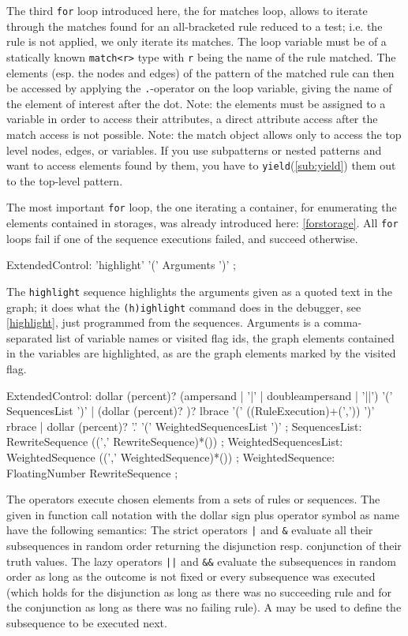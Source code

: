 The third \texttt{for} loop introduced here, the for matches loop, allows to iterate through the matches found for an all-bracketed rule reduced to a test; i.e. the rule is not applied, we only iterate its matches.
The loop variable must be of a statically known \texttt{match<r>} type with \texttt{r} being the name of the rule matched.
The elements (esp. the nodes and edges) of the pattern of the matched rule can then be accessed by applying the \texttt{.}-operator on the loop variable, giving the name of the element of interest after the dot.
Note: the elements must be assigned to a variable in order to access their attributes, a direct attribute access after the match access is not possible.
Note: the match object allows only to access the top level nodes, edges, or variables.
If you use subpatterns or nested patterns and want to access elements found by them, you have to \texttt{yield}(\ref{sub:yield}) them out to the top-level pattern.

The most important \texttt{for} loop, the one iterating a container, for enumerating the elements contained in storages, was already introduced here: \ref{forstorage}.
All \texttt{for} loops fail if one of the sequence executions failed, and succeed otherwise.

\begin{rail}
  ExtendedControl:
		'highlight' '(' Arguments ')'
    ;
\end{rail}
The \texttt{highlight} sequence highlights the arguments given as a quoted text in the graph;
it does what the \texttt{(h)ighlight} command does in the debugger, see \ref{highlight}, just programmed from the sequences. 
Arguments is a comma-separated list of variable names or visited flag ids, the graph elements contained in the variables are highlighted, as are the graph elements marked by the visited flag.

\begin{rail} 
  ExtendedControl: 
	dollar (percent)? (ampersand | '|' | doubleampersand | '||') '(' SequencesList ')' |
	(dollar (percent)? )? lbrace '(' ((RuleExecution)+(',')) ')' rbrace |
	dollar (percent)? '.' '(' WeightedSequencesList ')'
	;
  SequencesList:
	RewriteSequence ((',' RewriteSequence)*())
	;
  WeightedSequencesList:
	WeightedSequence ((',' WeightedSequence)*())
	;
  WeightedSequence:
	FloatingNumber RewriteSequence
	;
\end{rail}

The  operators execute chosen elements from a sets of rules or sequences.
The  given in function call notation with the dollar sign plus operator symbol as name have the following semantics:
The strict operators \verb/|/ and \verb/&/ evaluate all their subsequences in random order returning the disjunction resp. conjunction of their truth values.
The lazy operators \verb/||/ and \verb/&&/ evaluate the subsequences in random order as long as the outcome is not fixed or every subsequence was executed 
(which holds for the disjunction as long as there was no succeeding rule and for the conjunction as long as there was no failing rule).
A  may be used to define the subsequence to be executed next.

